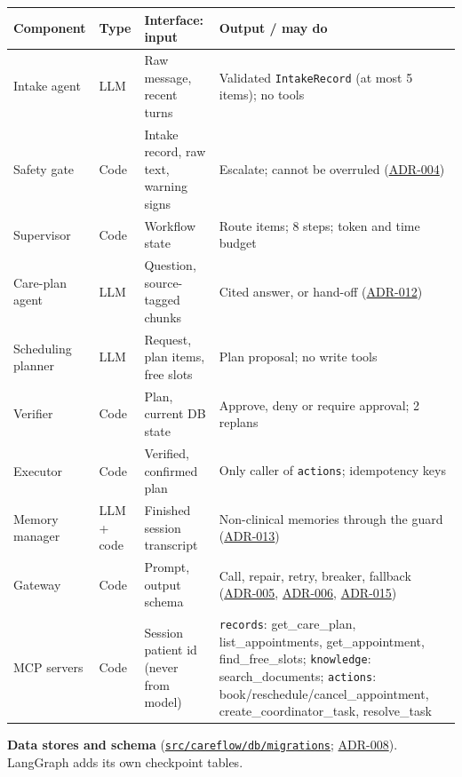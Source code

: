 \documentclass[10pt,a4paper]{article}
\newcommand{\repourl}{https://github.com/saideepaksana/careflow}
\newcommand{\rev}{cs5903-final-2026}
\newcommand{\dir}[1]{\href{\repourl/tree/\rev/#1}{\nolinkurl{#1}}}
\newcommand{\adr}[1]{\href{\repourl/blob/\rev/docs/Architecture_Decision_Records.md}{ADR-#1}}
\begin{document}
\begin{table}[htbp]
\centering
\footnotesize
\begin{tabularx}{\textwidth}{P{2.5cm} P{1.2cm} P{4.2cm} L}
\toprule
\textbf{Component} & \textbf{Type} & \textbf{Interface: input} & \textbf{Output / may do} \\
\midrule
Intake agent & LLM & Raw message, recent turns & Validated \texttt{IntakeRecord} (at most 5 items); no tools \\
Safety gate & Code & Intake record, raw text, warning signs & Escalate; cannot be overruled (\adr{004}) \\
Supervisor & Code & Workflow state & Route items; 8 steps; token and time budget \\
Care-plan agent & LLM & Question, source-tagged chunks & Cited answer, or hand-off (\adr{012}) \\
Scheduling planner & LLM & Request, plan items, free slots & Plan proposal; no write tools \\
Verifier & Code & Plan, current DB state & Approve, deny or require approval; 2 replans \\
Executor & Code & Verified, confirmed plan & Only caller of \texttt{actions}; idempotency keys \\
Memory manager & LLM + code & Finished session transcript & Non-clinical memories through the guard (\adr{013}) \\
Gateway & Code & Prompt, output schema & Call, repair, retry, breaker, fallback (\adr{005}, \adr{006}, \adr{015}) \\
MCP servers & Code & Session patient id (never from model) & \texttt{records}: get\_care\_plan, list\_appointments, get\_appointment, find\_free\_slots; \texttt{knowledge}: search\_documents; \texttt{actions}: book/reschedule/cancel\_appointment, create\_coordinator\_task, resolve\_task \\
\bottomrule
\end{tabularx}
\end{table}

\textbf{Data stores and schema} (\dir{src/careflow/db/migrations}; \adr{008}). LangGraph adds its own checkpoint tables.
\end{document}
